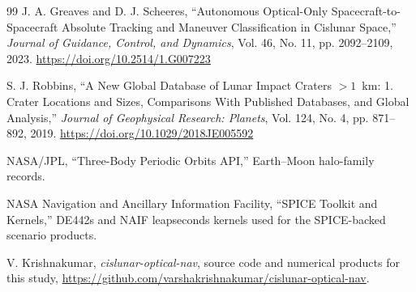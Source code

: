 \documentclass[10pt,twocolumn]{article}
\begin{document}
\begin{thebibliography}{99}
J. A. Greaves and D. J. Scheeres, ``Autonomous Optical-Only Spacecraft-to-Spacecraft Absolute Tracking and Maneuver Classification in Cislunar Space,'' \textit{Journal of Guidance, Control, and Dynamics}, Vol. 46, No. 11, pp. 2092--2109, 2023. \url{https://doi.org/10.2514/1.G007223}

S. J. Robbins, ``A New Global Database of Lunar Impact Craters $>1$~km: 1. Crater Locations and Sizes, Comparisons With Published Databases, and Global Analysis,'' \textit{Journal of Geophysical Research: Planets}, Vol. 124, No. 4, pp. 871--892, 2019. \url{https://doi.org/10.1029/2018JE005592}

NASA/JPL, ``Three-Body Periodic Orbits API,'' Earth--Moon halo-family records.

NASA Navigation and Ancillary Information Facility, ``SPICE Toolkit and Kernels,'' DE442s and NAIF leapseconds kernels used for the SPICE-backed scenario products.

V. Krishnakumar, \textit{cislunar-optical-nav}, source code and numerical products for this study, \url{https://github.com/varshakrishnakumar/cislunar-optical-nav}.

\end{thebibliography}
\end{document}
